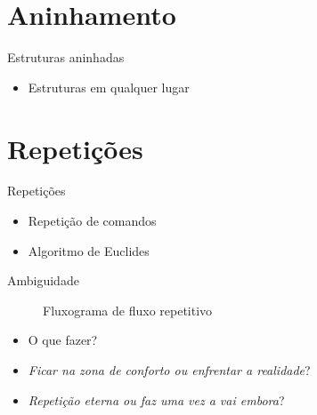 \documentclass[14pt]{beamer}
\begin{document}
	\section{Aninhamento}
		\begin{frame}{Estruturas aninhadas}
			\begin{itemize}
				\item Estruturas em qualquer lugar
			\end{itemize}
			\begin{multicols}{2}
				\only<1>{}
			\end{multicols}
		\end{frame}

	\section{Repetições}
		\begin{frame}{Repetições}
			\begin{itemize}
				\presentationPause\item Repetição de comandos
				\presentationPause\item Algoritmo de Euclides
			\end{itemize}
		\end{frame}

		\begin{frame}
			
		\end{frame}
		
		\begin{frame}{Ambiguidade}
			\presentationPause
			\begin{figure}
				\centering
				
				\caption{Fluxograma de fluxo repetitivo}
				\label{fig.flow.loop}
			\end{figure}
			\begin{itemize}
				\presentationPause\item O que fazer?
				\presentationPause\item \emph{Ficar na zona de conforto ou enfrentar a realidade}?
				\presentationPause\item \emph{Repetição eterna ou faz uma vez a vai embora}?
			\end{itemize}
		\end{frame}
\end{document}
